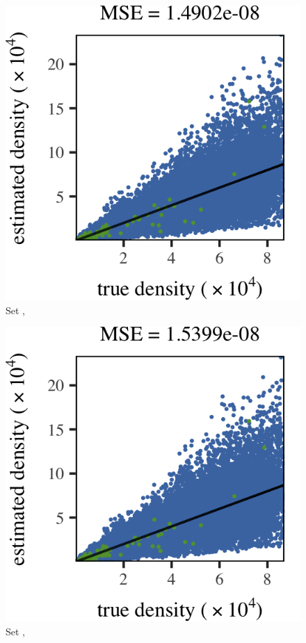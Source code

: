 \subfigvspace
\begin{subfigure}{0.3\textwidth}
	\centering
	\includegraphics[keepaspectratio=true, width=\textwidth, height=0.23\textheight]{result/img/results_baakman_1_60000_mbe_silverman}
	\caption{Set \baakmanOne, \mbe}
	\label{fig:results:singlesphere:mbe:baakman1}
\end{subfigure}
\begin{subfigure}{0.3\textwidth}
	\centering
	\includegraphics[keepaspectratio=true, width=\textwidth, height=0.23\textheight]{result/img/results_baakman_1_60000_sambe_silverman}
	\caption{Set \baakmanOne, \sambe}
	\label{fig:results:singlesphere:sambe:baakman1}
\end{subfigure}
